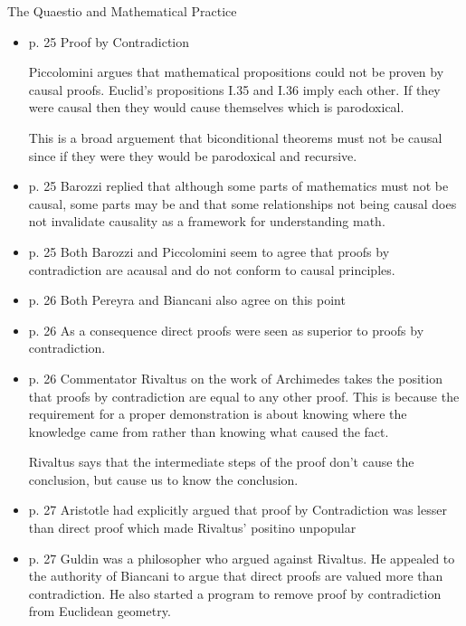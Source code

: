 \documentclass{report}
\begin{document}
{\large The Quaestio and Mathematical Practice}
\begin{itemize}
    \item p. 25 Proof by Contradiction
        \begin{mdframed}
            Piccolomini argues that mathematical propositions
            could not be proven by causal proofs. Euclid's propositions
            I.35 and I.36 imply each other. If they were causal
            then they would cause themselves which is parodoxical.

            This is a broad arguement that biconditional theorems
            must not be causal since if they were they would be
            parodoxical and recursive.
        \end{mdframed}
    \item p. 25 Barozzi replied that although some parts of mathematics
        must not be causal, some parts may be and that some relationships
        not being causal does not invalidate causality as a framework
        for understanding math.
    \item p. 25 Both Barozzi and Piccolomini seem to agree that
        proofs by contradiction are acausal and do not
        conform to causal principles.
    \item p. 26 Both Pereyra and Biancani also agree on
        this point
    \item p. 26 As a consequence direct proofs were seen
        as superior to proofs by contradiction.
    \item p. 26 Commentator Rivaltus on the work of Archimedes
        takes the position that proofs by contradiction are
        equal to any other proof. This is because the requirement
        for a proper demonstration is about knowing where the
        knowledge came from rather than knowing what caused
        the fact.
        \begin{mdframed}
            Rivaltus says that the intermediate steps of the
            proof don't cause the conclusion, but cause us
            to know the conclusion.
        \end{mdframed}
    \item p. 27 Aristotle had explicitly argued that proof by
        Contradiction was lesser than direct proof which made
        Rivaltus' positino unpopular
    \item p. 27 Guldin was a philosopher who argued against
        Rivaltus. He appealed to the authority of
        Biancani to argue that direct proofs are valued more
        than contradiction. He also started a program to remove
        proof by contradiction from Euclidean geometry.
\end{itemize}
\end{document}
